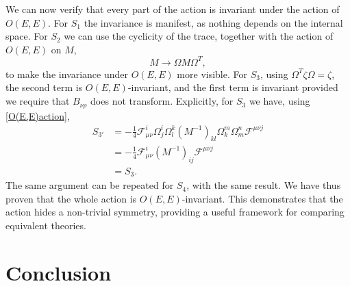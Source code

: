 \documentclass{article}
\begin{document}
We can now verify that every part of the action is invariant under the action of $O(E,E)$.
For $S_1$ the invariance is manifest, as nothing depends on the internal space.
For $S_2$ we can use the cyclicity of the trace, together with the action of $O(E,E)$ on $M$,
\begin{equation*}
    M \rightarrow \Omega M \Omega^T,
\end{equation*}
to make the invariance under $O(E,E)$ more visible.
For $S_3$, using $\Omega^T \zeta \Omega = \zeta$, the second term is $O(E,E)$-invariant, and the first term is invariant provided we require that $B_{\nu \rho}$ does not transform.
Explicitly, for $S_3$ we have, using \eqref{O(E,E)action},
\begin{equation}
\begin{aligned}
    S_{3'} &= -\frac{1}{4} \mathcal{F}^i_{\mu \nu} \Omega^i_j \Omega^k_l (M^{-1})_{kl} \Omega^m_k  \Omega^n_m\mathcal{F}^{\mu \nu j} \\
    &=-\frac{1}{4} \mathcal{F}^i_{\mu \nu}  (M^{-1})_{ij} \mathcal{F}^{\mu \nu j}\\
    &= S_3.
\end{aligned}
\end{equation}
The same argument can be repeated for $S_4$, with the same result. We have thus proven that the whole action is $O(E,E)$-invariant. This demonstrates that the action hides a non-trivial symmetry, providing a useful framework for comparing equivalent theories.
\section{Conclusion}
\end{document}
